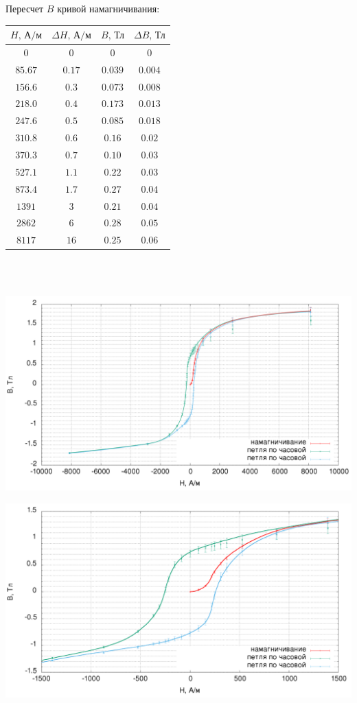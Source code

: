 \documentclass[a4paper]{article}
\begin{document}
\begin{enumerate}
Пересчет $B$ кривой намагничивания:
\begin{center}
\begin{tabular}{|c|c|c|c|}\hline
$H\text{, А/м}$&$\Delta H\text{, А/м}$&$B\text{, Тл}$&$\Delta B\text{, Тл}$\\\hline
$0$&$0$&$0$&$0$\\\hline
$85.67$&$0.17$&$0.039$&$0.004$\\\hline
$156.6$&$0.3$&$0.073$&$0.008$\\\hline
$218.0$&$0.4$&$0.173$&$0.013$\\\hline
$247.6$&$0.5$&$0.085$&$0.018$\\\hline
$310.8$&$0.6$&$0.16$&$0.02$\\\hline
$370.3$&$0.7$&$0.10$&$0.03$\\\hline
$527.1$&$1.1$&$0.22$&$0.03$\\\hline
$873.4$&$1.7$&$0.27$&$0.04$\\\hline
$1391$&$3$&$0.21$&$0.04$\\\hline
$2862$&$6$&$0.28$&$0.05$\\\hline
$8117$&$16$&$0.25$&$0.06$\\\hline
\end{tabular}\\~\\
\end{center}

\begin{center}
\includegraphics[width=\textwidth]{5_big.png}
\end{center}
\begin{center}
\includegraphics[width=\textwidth]{5_small.png}
\end{center}


\end{enumerate}
\end{document}
